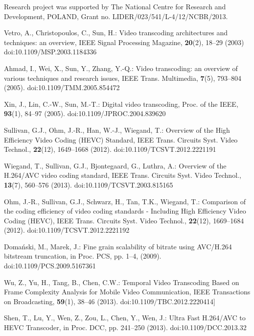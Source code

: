 \documentclass[twocolumn]{svjour3}          %
\begin{document}
\begin{acknowledgements}
Research project was supported by The National Centre for Research and Development, POLAND, Grant no. LIDER/023/541/L-4/12/NCBR/2013.
\end{acknowledgements}

\begin{thebibliography}{}

Vetro, A., Christopoulos, C., Sun, H.: Video transcoding architectures and techniques: an overview, IEEE Signal Processing Magazine, \textbf{20}(2), 18–29 (2003) doi:10.1109/MSP.2003.1184336

Ahmad, I., Wei, X., Sun, Y., Zhang, Y.-Q.: Video transcoding: an overview of various techniques and research issues, IEEE Trans. Multimedia, \textbf{7}(5), 793–804 (2005). doi:10.1109/TMM.2005.854472

Xin, J., Lin, C.-W., Sun, M.-T.: Digital video transcoding, Proc. of the IEEE, \textbf{93}(1), 84–97 (2005). doi:10.1109/JPROC.2004.839620

Sullivan, G.J., Ohm, J.-R., Han, W.-J., Wiegand, T.: Overview of the High Efficiency Video Coding (HEVC) Standard, IEEE Trans. Circuits Syst. Video Technol., \textbf{22}(12), 1649–1668 (2012). doi:10.1109/TCSVT.2012.2221191

Wiegand, T., Sullivan, G.J., Bjontegaard, G., Luthra, A.: Overview of the H.264/AVC video coding standard, IEEE Trans. Circuits Syst. Video Technol., \textbf{13}(7), 560–576 (2013). doi:10.1109/TCSVT.2003.815165

Ohm, J.-R., Sullivan, G.J., Schwarz, H., Tan, T.K., Wiegand, T.: Comparison of the coding efficiency of video coding standards - Including High Efficiency Video Coding (HEVC), IEEE Trans. Circuits Syst. Video Technol., \textbf{22}(12), 1669–1684 (2012). doi:10.1109/TCSVT.2012.2221192

Doma\'nski, M., Marek, J.: Fine grain scalability of bitrate using AVC/H.264 bitstream truncation, in Proc. PCS, pp. 1–4, (2009). doi:10.1109/PCS.2009.5167361

Wu, Z., Yu, H., Tang, B., Chen, C.W.: Temporal Video Transcoding Based on Frame Complexity Analysis for Mobile Video Communication, IEEE Transactions on Broadcasting, \textbf{59}(1), 38–46 (2013). doi:10.1109/TBC.2012.2220414]

Shen, T., Lu, Y., Wen, Z., Zou, L., Chen, Y., Wen, J.: Ultra Fast H.264/AVC to HEVC Transcoder, in Proc. DCC, pp. 241–250 (2013). doi:10.1109/DCC.2013.32


\end{thebibliography}
\end{document}
